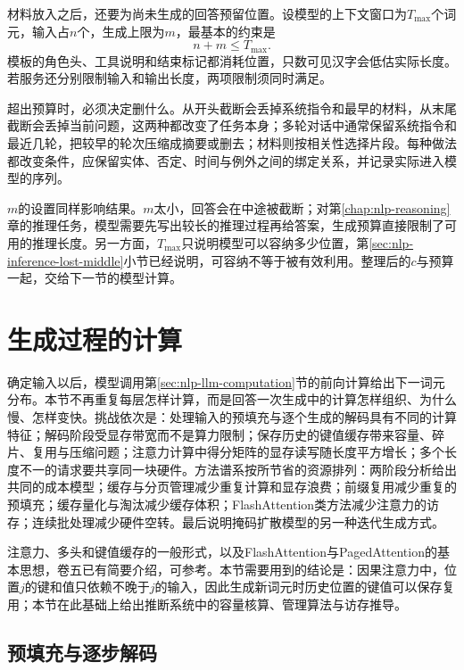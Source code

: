 材料放入之后，还要为尚未生成的回答预留位置。设模型的上下文窗口为$T_{\max}$个词元，输入占$n$个，生成上限为$m$，最基本的约束是
\begin{equation}
 n+m\leq T_{\max}.
 \label{eq:nlp-inference-budget}
\end{equation}
模板的角色头、工具说明和结束标记都消耗位置，只数可见汉字会低估实际长度。若服务还分别限制输入和输出长度，两项限制须同时满足。

超出预算时，必须决定删什么。从开头截断会丢掉系统指令和最早的材料，从末尾截断会丢掉当前问题，这两种都改变了任务本身；多轮对话中通常保留系统指令和最近几轮，把较早的轮次压缩成摘要或删去；材料则按相关性选择片段。每种做法都改变条件，应保留实体、否定、时间与例外之间的绑定关系，并记录实际进入模型的序列。

$m$的设置同样影响结果。$m$太小，回答会在中途被截断；对第\ref{chap:nlp-reasoning}章的推理任务，模型需要先写出较长的推理过程再给答案，生成预算直接限制了可用的推理长度。另一方面，$T_{\max}$只说明模型可以容纳多少位置，第\ref{sec:nlp-inference-lost-middle}小节已经说明，可容纳不等于被有效利用。整理后的$c$与预算一起，交给下一节的模型计算。

\section{生成过程的计算}
\label{sec:nlp-inference-computation}

确定输入以后，模型调用第\ref{sec:nlp-llm-computation}节的前向计算给出下一词元分布。本节不再重复每层怎样计算，而是回答一次生成中的计算怎样组织、为什么慢、怎样变快。挑战依次是：处理输入的预填充与逐个生成的解码具有不同的计算特征；解码阶段受显存带宽而不是算力限制；保存历史的键值缓存带来容量、碎片、复用与压缩问题；注意力计算中得分矩阵的显存读写随长度平方增长；多个长度不一的请求要共享同一块硬件。方法谱系按所节省的资源排列：两阶段分析给出共同的成本模型；缓存与分页管理减少重复计算和显存浪费；前缀复用减少重复的预填充；缓存量化与淘汰减少缓存体积；FlashAttention类方法减少注意力的访存；连续批处理减少硬件空转。最后说明掩码扩散模型的另一种迭代生成方式。

注意力、多头和键值缓存的一般形式，以及FlashAttention与PagedAttention的基本思想，卷五已有简要介绍，可参考。本节需要用到的结论是：因果注意力中，位置$j$的键和值只依赖不晚于$j$的输入，因此生成新词元时历史位置的键值可以保存复用；本节在此基础上给出推断系统中的容量核算、管理算法与访存推导。

\subsection{预填充与逐步解码}
\label{sec:nlp-inference-autoregression}

